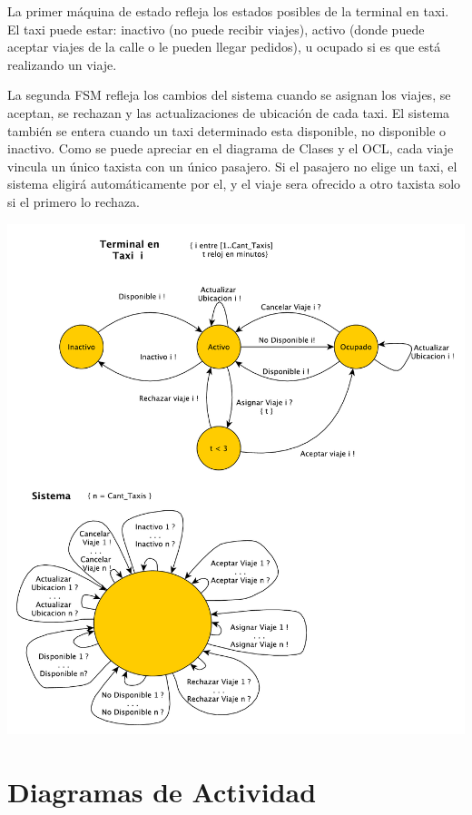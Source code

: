 \documentclass[a4paper]{article}
\begin{document}
La primer m\'aquina de estado refleja los estados posibles de la terminal en taxi. El taxi
puede estar: inactivo (no puede recibir viajes), activo (donde puede aceptar viajes de la calle o le pueden llegar pedidos),
u ocupado si es que est\'a realizando un viaje.

La segunda FSM refleja los cambios del sistema cuando se asignan los viajes, se aceptan, se rechazan y las actualizaciones de ubicaci\'on de cada
taxi. El sistema tambi\'en se entera cuando un taxi determinado esta disponible, no disponible o inactivo. Como se puede apreciar en el diagrama de Clases y el OCL, cada viaje vincula un \'unico taxista con un \'unico pasajero. Si el pasajero no elige un taxi, el sistema eligir\'a autom\'aticamente por el, y el viaje sera ofrecido a otro taxista solo si el primero lo rechaza.

\begin{center}
\includegraphics[scale=0.7]{diag_FSM.pdf}
\end{center}

\clearpage
\section{Diagramas de Actividad}
\end{document}
